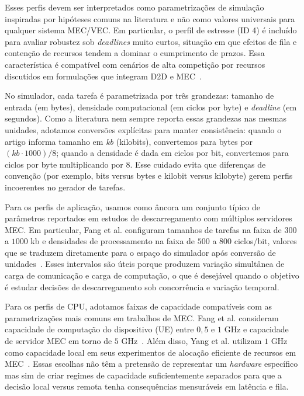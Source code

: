 Esses perfis devem ser interpretados como parametrizações de simulação inspiradas por hipóteses comuns na literatura e não como valores universais para qualquer sistema \gls{MEC}/\gls{VEC}. Em particular, o perfil de estresse (ID 4) é incluído para avaliar robustez sob \textit{deadlines} muito curtos, situação em que efeitos de fila e contenção de recursos tendem a dominar o cumprimento de prazos. Essa característica é compatível com cenários de alta competição por recursos discutidos em formulações que integram \gls{D2D} e \gls{MEC}~\cite{he2019d2d_mec_twc}.

No simulador, cada tarefa é parametrizada por três grandezas: tamanho de entrada (em bytes), densidade computacional (em ciclos por byte) e \textit{deadline} (em segundos). Como a literatura nem sempre reporta essas grandezas nas mesmas unidades, adotamos conversões explícitas para manter consistência: quando o artigo informa tamanho em \emph{kb} (kilobits), convertemos para bytes por $(kb \cdot 1000)/8$; quando a densidade é dada em ciclos por bit, convertemos para ciclos por byte multiplicando por $8$. Esse cuidado evita que diferenças de convenção (por exemplo, bits versus bytes e kilobit versus kilobyte) gerem perfis incoerentes no gerador de tarefas.

Para os perfis de aplicação, usamos como âncora um conjunto típico de parâmetros reportados em estudos de descarregamento com múltiplos servidores \gls{MEC}. Em particular, Fang et al. configuram tamanhos de tarefas na faixa de $300$ a $1000$ kb e densidades de processamento na faixa de $500$ a $800$ ciclos/bit, valores que se traduzem diretamente para o espaço do simulador após conversão de unidades~\cite{fang2021mec_iot}. Esses intervalos são úteis porque produzem variação simultânea de carga de comunicação e carga de computação, o que é desejável quando o objetivo é estudar decisões de descarregamento sob concorrência e variação temporal.

Para os perfis de \gls{CPU}, adotamos faixas de capacidade compatíveis com as parametrizações mais comuns em trabalhos de \gls{MEC}. Fang et al. consideram capacidade de computação do dispositivo (UE) entre $0{,}5$ e $1$ GHz e capacidade de servidor \gls{MEC} em torno de $5$ GHz~\cite{fang2021mec_iot}. Além disso, Yang et al. utilizam $1$ GHz como capacidade local em seus experimentos de alocação eficiente de recursos em \gls{MEC}~\cite{yang2019noma_mec}. Essas escolhas não têm a pretensão de representar um \textit{hardware} específico mas sim de criar regimes de capacidade suficientemente separados para que a decisão local versus remota tenha consequências mensuráveis em latência e fila.

